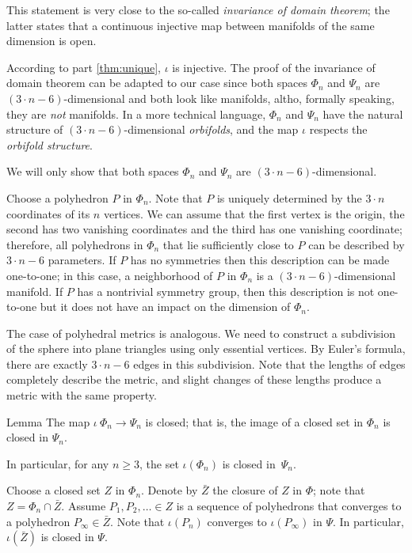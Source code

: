 \documentclass[oneside,a4paper]{article}
\begin{document}
This statement is very close to the so-called \emph{invariance of domain theorem};
the latter states that a continuous injective map between manifolds of the same dimension is open.

According to part \ref{thm:unique}, $\iota$ is injective.
The proof of the invariance of domain theorem can be adapted to our case since both spaces $\Phi_n$ and $\Psi_n$ are $(3\cdot n-6)$-dimensional and both look like manifolds, altho, formally speaking, they are \emph{not} manifolds.
In a more technical language, $\Phi_n$ and $\Psi_n$ have the natural structure of $(3\cdot n-6)$-dimensional \emph{orbifolds},
and the map $\iota$ respects the \emph{orbifold structure}.

We will only show that both spaces $\Phi_n$ and $\Psi_n$ are $(3\cdot n-6)$-dimensional.

Choose a polyhedron $P$ in $\Phi_n$.
Note that $P$ is uniquely determined by the $3\cdot n$ coordinates of its $n$ vertices.
We can assume that the first vertex is the origin, the second has two vanishing coordinates and the third has one vanishing coordinate; therefore, all polyhedrons in $\Phi_n$ that lie sufficiently close to $P$ can be described by $3\cdot n-6$ parameters.
If $P$ has no symmetries then this description can be made one-to-one;
in this case, a neighborhood of $P$ in $\Phi_n$ is a $(3\cdot n-6)$-dimensional manifold.
If $P$ has a nontrivial symmetry group, then this description is not one-to-one but it does not have an impact on the dimension of $\Phi_n$.

The case of polyhedral metrics is analogous.
We need to construct a subdivision of the sphere into plane triangles using only essential vertices.
By Euler's formula, there are exactly $3\cdot n-6$ edges in this subdivision.
Note that the lengths of edges completely describe the metric, and slight changes of these lengths produce a metric with the same property.

\begin{thm}{Lemma}
The map $\iota\:\Phi_n\to\Psi_n$ is closed;
that is, the image of a closed set in $\Phi_n$ is closed in $\Psi_n$.

In particular, for any $n\ge 3$, the set $\iota(\Phi_n)$ is closed in~$\Psi_n$.
\end{thm}

Choose a closed set $Z$ in $\Phi_n$.
Denote by $\bar Z$ the closure of $Z$ in $\Phi$; note that $Z=\Phi_n\cap \bar Z$.
Assume $P_1,P_2,\dots\in Z$ is a sequence of polyhedrons that converges to a polyhedron $P_\infty\in\bar Z$.
Note that $\iota(P_n)$ converges to $\iota(P_\infty)$ in $\Psi$.
In particular, $\iota(\bar Z)$ is closed in $\Psi$.
\end{document}
